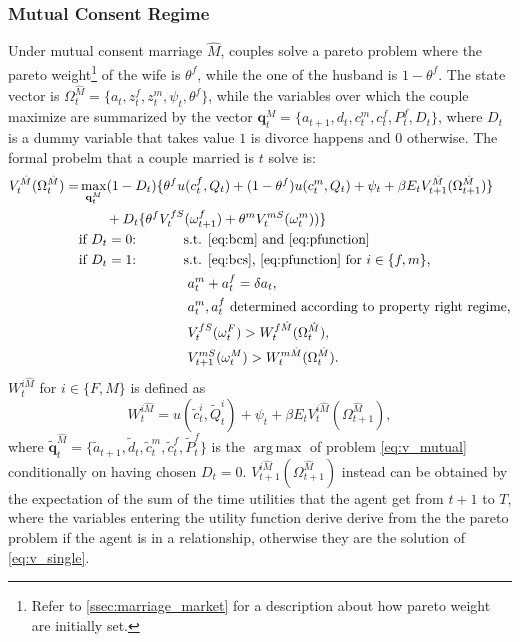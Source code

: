 \documentclass[12pt]{article}
\numberwithin{table}{section}
\DeclareMathOperator*{\argmax}{arg\,max}
\begin{document}
\subsubsection*{Mutual Consent Regime}
Under mutual consent marriage $\hat{M}$, couples solve a pareto problem where the pareto weight\footnote{Refer to \autoref{ssec:marriage_market} for a description about how pareto weight are initially set.} of the wife is $\theta^f$, while the one of the husband is $1-\theta^f$. The state vector is $\Omega^{\hat{M}}_t=\{a_t,z^f_t,z^m_t,\psi_t,\theta^f\}$, while the variables over which the couple maximize are summarized by the vector $\mathbf{q}^M_t=\{a_{t+1},d_{t},c^m_{t},c^f_{t},P^f_t,D_t\}$, where $D_t$ is a dummy variable that takes value $1$ is divorce happens and $0$ otherwise. The formal probelm that a couple married is $t$ solve is:
\begin{equation}\label{eq:v_mutual}
\begin{split}
V_t^{\hat{M}}(\Omega^{\hat{M}}_t)=&\max_{\mathbf{q}^M_t} (1-D_t)\{\theta^f u(c^f_t,Q_t)+(1-\theta^f)u(c^m_t,Q_t)+\psi_t+\beta E_t V^{\hat{M}}_{t+1}(\Omega^{\hat{M}}_{t+1})\}\\ &\quad\quad+D_t \{\theta^fV^{fS}_{t}(\omega^{f}_{t+1})+\theta^m  V^{mS}_{t}(\omega^{m}_{t}))\}
\\ &\text{if $D_t=0$:}\hspace{35pt}\text{s.t. \eqref{eq:bcm} and \eqref{eq:pfunction}
}
\\ &\text{if $D_t=1$:}\hspace{35pt}\text{s.t. \eqref{eq:bcs}, \eqref{eq:pfunction} for $i\in\{f,m\}$,}\\ &
\hspace{80pt}a_t^m+a_t^f=\delta a_t,	\\ &
\hspace{80pt}a_t^m,a_t^f\text{ determined according to property right regime,}	\\ &\hspace{80pt}
V_{t}^{fS}(\omega^F_{t})> W^{f\hat{M}}_{t}(\Omega^{\hat{M}}_{t}),\\ &\hspace{80pt}
V_{t+1}^{mS}(\omega^M_{t})> W^{m\hat{M}}_{t}(\Omega^{\hat{M}}_{t}).
\end{split}
\end{equation}
$W_{t}^{i\hat{M}}$ for $i\in\{F,M\}$ is defined as 
\begin{equation}
W_{t}^{i\hat{M}}=u(\tilde{c}_t^{i},\tilde{Q}_t^{i})+\psi_t+\beta E_t V_{t}^{i\hat{M}}(\Omega^{\hat{M}}_{t+1}),
\end{equation}
where $\mathbf{\tilde{q}}^{\hat{M}}_t=\{\tilde{a}_{t+1},\tilde{d}_{t},\tilde{c}^{m}_{t},\tilde{c}^{f}_{t},\tilde{P}^{f}_t\}$ is the $\argmax$ of problem \eqref{eq:v_mutual} conditionally on having chosen $D_t=0$. $V_{t+1}^{i\hat{M}}(\Omega^{\hat{M}}_{t+1})$ instead can be obtained by the expectation of the sum of the time utilities that the agent get from $t+1$ to $T$, where the variables entering the utility function derive derive from the the pareto problem if the agent is in a relationship, otherwise they are the solution of \eqref{eq:v_single}.
\end{document}
